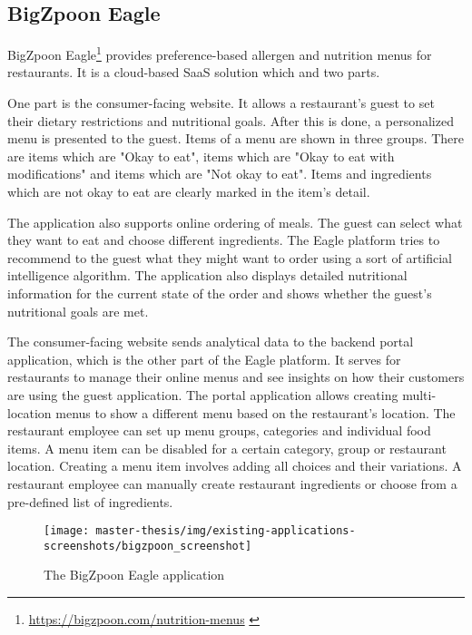 \newpage

\subsection*{BigZpoon Eagle}
  BigZpoon Eagle\footnote{\url{https://bigzpoon.com/nutrition-menus}  \label{fnlabel}} provides preference-based allergen and nutrition menus for \linebreak restaurants.
  It is a cloud-based SaaS solution which and two parts.

  One part is the consumer-facing website.
  It allows a restaurant's guest to set their dietary restrictions and nutritional goals.
  After this is done, a personalized menu is presented to the guest.
  Items of a menu are shown in three groups.
  There are items which are "Okay to eat", items which are "Okay to eat with modifications" and items which are "Not okay to eat".
  Items and ingredients which are not okay to eat are clearly marked in the item's detail.
  
  The application also supports online ordering of meals.
  The guest can select what they want to eat and choose different ingredients.
  The Eagle platform tries to recommend to the guest what they might want to order using a sort of artificial intelligence algorithm.
  The application also displays detailed nutritional information for the current state of the order and shows whether the guest's nutritional goals are met.

  The consumer-facing website sends analytical data to the backend portal application, which is the other part of the Eagle platform.
  It serves for restaurants to manage their online menus and see insights on how their customers are using the guest application.
  The portal application allows creating multi-location menus to show a different menu based on the restaurant's location.
  The restaurant employee can set up menu groups, categories and individual food items.
  A menu item can be disabled for a certain category, group or restaurant location.
  Creating a menu item involves adding all choices and their variations.
  A restaurant employee can manually create restaurant ingredients or choose from a pre-defined list of ingredients.

  \begin{figure}[h]
    \centering
    \texttt{[image: master-thesis/img/existing-applications-screenshots/bigzpoon\_screenshot]}
    \caption{The BigZpoon Eagle application}
  \end{figure}

